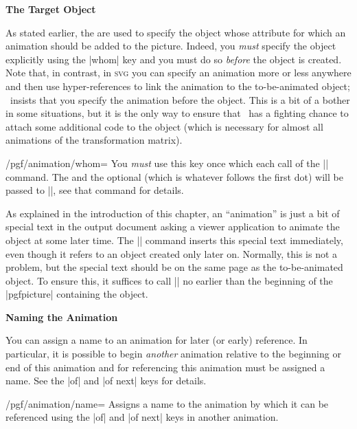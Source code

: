 \begin{command}{\pgfanimateattribute{}}
  \medskip
  \textbf{The Target Object}

  As stated earlier, the  are used to specify the object
  whose attribute for which an animation should be added to the
  picture. Indeed, you \emph{must} specify the object explicitly using
  the |whom| key and you must do so \emph{before} the object is
  created. Note that, in contrast, in \textsc{svg} you can specify an
  animation more or less anywhere and then use hyper-references to
  link the animation to the to-be-animated object; \pgfname\ insists
  that you specify the animation before the object. This is a bit of a
  bother in some situations, but it is the only way to ensure that
  \pgfname\ has a fighting chance to attach some additional code to
  the object (which is necessary for almost all animations of the
  transformation matrix).

  \begin{key}{/pgf/animation/whom=}
    You \emph{must} use this key once which each call of the
    |\pgfanimateattribute| command. The  and the optional
     (which is whatever follows the first dot) will be
    passed to |\pgfidrefnextuse|, see that command for details. 
  \end{key}

  As explained in the introduction of this chapter, an ``animation''
  is just a bit of special text in the output document asking a viewer
  application to animate the object at some later time. The
  |\pgfanimateattribute| command inserts this special text immediately,
  even though it refers to an object created only later on. Normally,
  this is not a problem, but the special text should be on the same
  page as the to-be-animated object. To ensure this, it suffices to
  call |\pgfanimateattribute| no earlier than the beginning of the
  |pgfpicture| containing the object.

  \medskip
  \textbf{Naming the Animation}

  You can assign a name to an animation for later (or early)
  reference. In particular, it is possible to begin \emph{another}
  animation relative to the beginning or end of this animation and for
  referencing this animation must be assigned a name. See the |of| and
  |of next| keys for details.

  \begin{key}{/pgf/animation/name=}
    Assigns a name to the animation by which it can be referenced
    using the |of| and |of next| keys in another animation.
\begin{codeexample}[width=2cm]
\end{codeexample}
  \end{key}
\end{command}


